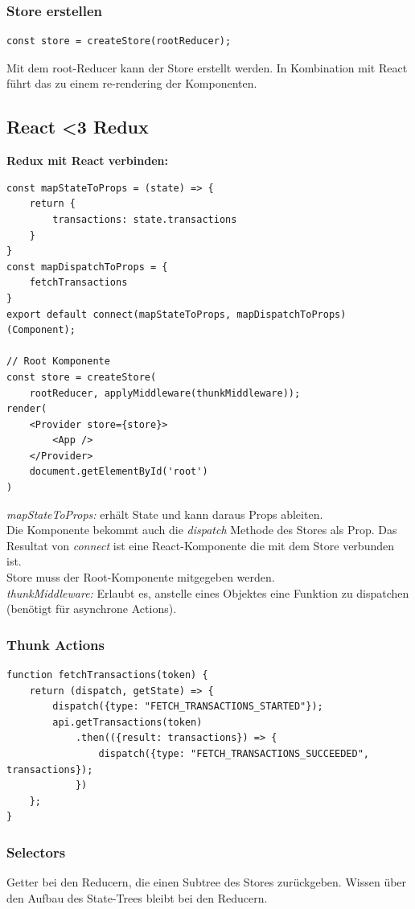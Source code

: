 \subsubsection{Store erstellen}
\begin{lstlisting}
const store = createStore(rootReducer);
\end{lstlisting}
Mit dem root-Reducer kann der Store erstellt werden.
In Kombination mit React führt das zu einem re-rendering der Komponenten.

\subsection{React \textless 3 Redux}
\textbf{Redux mit React verbinden:}
\begin{lstlisting}
const mapStateToProps = (state) => {
    return {
        transactions: state.transactions
    }
}
const mapDispatchToProps = {
    fetchTransactions
}
export default connect(mapStateToProps, mapDispatchToProps)(Component);

// Root Komponente
const store = createStore(
    rootReducer, applyMiddleware(thunkMiddleware));
render(
    <Provider store={store}>
        <App />
    </Provider>
    document.getElementById('root')
)
\end{lstlisting}
\textit{mapStateToProps:} erhält State und kann daraus Props ableiten.\\
Die Komponente bekommt auch die \textit{dispatch} Methode des Stores als Prop.
Das Resultat von \textit{connect} ist eine React-Komponente die mit dem Store verbunden ist.\\
Store muss der Root-Komponente mitgegeben werden.\\
\textit{thunkMiddleware:} Erlaubt es, anstelle eines Objektes eine Funktion zu dispatchen (benötigt für asynchrone Actions).

\subsubsection{Thunk Actions}
\begin{lstlisting}
function fetchTransactions(token) {
    return (dispatch, getState) => {
        dispatch({type: "FETCH_TRANSACTIONS_STARTED"});
        api.getTransactions(token)
            .then(({result: transactions}) => {
                dispatch({type: "FETCH_TRANSACTIONS_SUCCEEDED", transactions});
            })
    };
}
\end{lstlisting}

\subsubsection{Selectors}
Getter bei den Reducern, die einen Subtree des Stores zurückgeben.
Wissen über den Aufbau des State-Trees bleibt bei den Reducern.